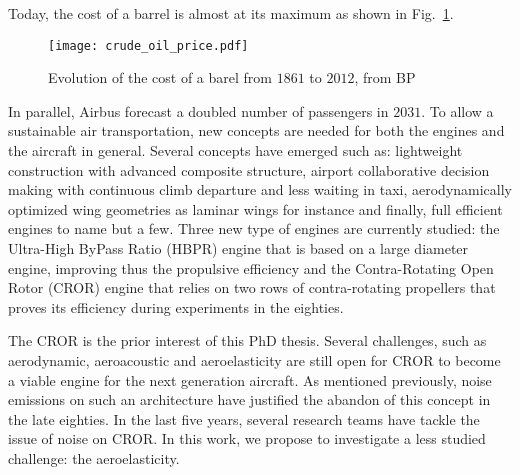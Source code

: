 Today, the cost of a barrel is almost at its maximum as shown
in Fig.~\ref{fig:crude_oil_price}.
\begin{figure}[htp]
  \centering
  \texttt{[image: crude\_oil\_price.pdf]}
  \caption{Evolution of the cost of a barel from $1861$ to $2012$, from BP~\cite{bpreview2013}}
  \label{fig:crude_oil_price}
\end{figure}
In parallel, Airbus forecast a doubled number of passengers in
$2031$. To allow a sustainable air transportation, new
concepts are needed for both the engines and the 
aircraft in general.
Several concepts have emerged such as: lightweight construction
with advanced composite structure, airport collaborative decision
making with continuous climb departure and less waiting in taxi,
aerodynamically optimized wing geometries as laminar wings for instance
and finally, full efficient engines to name but a few.
Three new type of engines are currently studied: the
Ultra-High ByPass Ratio (HBPR) engine that is based on a
large diameter engine, improving thus the
propulsive efficiency and the Contra-Rotating Open Rotor (CROR)
engine that relies on two rows of contra-rotating propellers
that proves its efficiency during experiments in the
eighties.

The CROR is the prior interest of this PhD thesis.
Several challenges, such as aerodynamic,
aeroacoustic and aeroelasticity are still open for CROR
to become a viable engine for the next generation aircraft.
As mentioned previously, noise emissions on such an architecture
have justified the abandon of this concept in the late eighties.
In the last five years, several research teams have tackle
the issue of noise on CROR. In this work, we propose to 
investigate a less studied challenge: the aeroelasticity.

 








  









